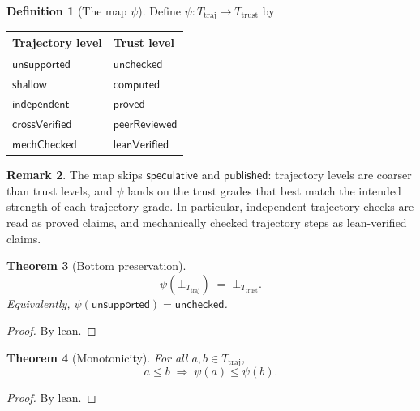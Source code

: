 \documentclass[11pt,a4paper]{article}
\theoremstyle{plain}
\newtheorem{theorem}{Theorem}[section]
\theoremstyle{definition}
\newtheorem{definition}[theorem]{Definition}
\newtheorem{remark}[theorem]{Remark}
\begin{document}
\begin{definition}[The map $\psi$]\label{def:psi}
Define $\psi : T_{\mathrm{traj}} \to T_{\mathrm{trust}}$ by
\begin{center}
\begin{tabular}{ll}
\hline
Trajectory level & Trust level \\
\hline
$\mathsf{unsupported}$ & $\mathsf{unchecked}$ \\
$\mathsf{shallow}$ & $\mathsf{computed}$ \\
$\mathsf{independent}$ & $\mathsf{proved}$ \\
$\mathsf{crossVerified}$ & $\mathsf{peerReviewed}$ \\
$\mathsf{mechChecked}$ & $\mathsf{leanVerified}$ \\
\hline
\end{tabular}
\end{center}
\end{definition}

\begin{remark}
The map skips $\mathsf{speculative}$ and $\mathsf{published}$: trajectory
levels are coarser than trust levels, and $\psi$ lands on the trust grades
that best match the intended strength of each trajectory grade. In
particular, independent trajectory checks are read as proved claims, and
mechanically checked trajectory steps as lean-verified claims.
\end{remark}

\begin{theorem}[Bottom preservation]\label{thm:psi-bot}
\begin{equation}
  \psi(\bot_{T_{\mathrm{traj}}}) \;=\; \bot_{T_{\mathrm{trust}}}.
\end{equation}
Equivalently, $\psi(\mathsf{unsupported}) = \mathsf{unchecked}$.
\end{theorem}

\begin{proof}
By lean.
\end{proof}

\begin{theorem}[Monotonicity]\label{thm:psi-mono}
For all $a, b \in T_{\mathrm{traj}}$,
\begin{equation}
  a \le b \;\Longrightarrow\; \psi(a) \le \psi(b).
\end{equation}
\end{theorem}

\begin{proof}
By lean.
\end{proof}
\end{document}
